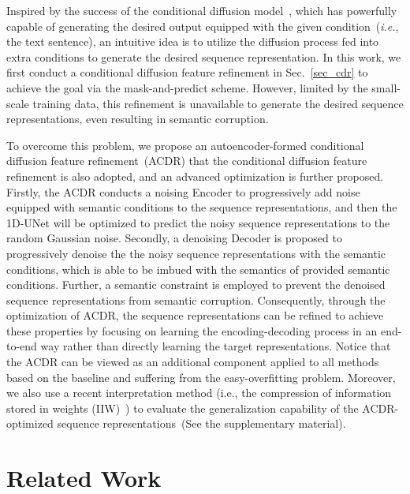 \documentclass[sigconf]{acmart}
\begin{document}
Inspired by the success of the conditional diffusion model~\cite{han2022card,2022StableDiffusion,2022imagen,Ruan2022MMDiffusionLM,Luo2022SemanticConditionalDN}, which has powerfully capable of generating the desired output equipped with the given condition~(\textit{i.e.}, the text sentence), an intuitive idea is to utilize the diffusion process fed into extra conditions to generate the desired sequence representation. 
In this work, we first conduct a conditional diffusion feature refinement in Sec.~\ref{sec_cdr} to achieve the goal via the mask-and-predict scheme.
However, limited by the small-scale training data, this refinement is unavailable to generate the desired sequence representations, even resulting in semantic corruption.


To overcome this problem, we propose an autoencoder-formed conditional diffusion feature refinement~(ACDR) that the conditional diffusion feature refinement is also adopted, and an advanced  optimization is further proposed. 
Firstly, the ACDR conducts a noising Encoder to progressively add noise equipped with semantic conditions to the sequence representations, and then the 1D-UNet will be optimized to predict the noisy sequence representations to the random Gaussian noise.
Secondly, a denoising Decoder is proposed to progressively denoise the 
the noisy sequence representations with the semantic conditions, which is able to be imbued with the semantics of provided semantic conditions. 
Further, a semantic constraint is employed to prevent the denoised sequence representations from semantic corruption.
Consequently, through the optimization of ACDR, the sequence representations can be refined to achieve these properties by 
focusing on learning the encoding-decoding process in an end-to-end way rather than directly learning the target representations.
Notice that the ACDR can be viewed as an additional component applied to all methods based on the baseline and suffering from the easy-overfitting problem.
Moreover, we also use a recent interpretation method (i.e., the compression of information
stored in weights (IIW)~\cite{PIB2022}) to evaluate the generalization capability of the ACDR-optimized sequence representations~(See the supplementary material).





\section{Related Work}
\label{sec:related work}
\end{document}
